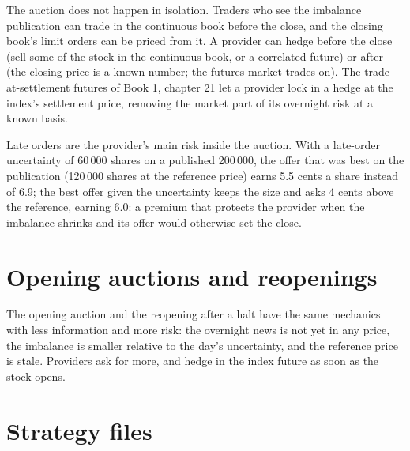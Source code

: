 The auction does not happen in isolation. Traders who see the imbalance publication can trade in the continuous book before the close, and the
closing book's limit orders can be priced from it. A provider can hedge before the close (sell some of the stock in the continuous book, or a
correlated future) or after (the closing price is a known number; the futures market trades on). The trade-at-settlement futures of Book 1,
chapter 21 let a provider lock in a hedge at the index's settlement price, removing the market part of its overnight risk at a known basis.

Late orders are the provider's main risk inside the auction. With a late-order uncertainty of 60\,000 shares on a published 200\,000, the offer
that was best on the publication (120\,000 shares at the reference price) earns 5.5 cents a share instead of 6.9; the best offer given the
uncertainty keeps the size and asks 4 cents above the reference, earning 6.0: a premium that protects the provider when the imbalance shrinks and
its offer would otherwise set the close.

\section{Opening auctions and reopenings}

The opening auction and the reopening after a halt have the same mechanics with less information and more risk: the overnight news is not yet
in any price, the imbalance is smaller relative to the day's uncertainty, and the reference price is stale. Providers ask for more, and hedge in the index future as soon as the stock opens.

\section{Strategy files}

